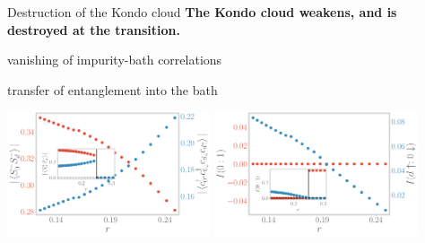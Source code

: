 \documentclass[9pt,aspectratio=169]{beamer}
\begin{document}
\begin{frame}{Destruction of the Kondo cloud}
\centering
\textbf{The Kondo cloud \alert{weakens, and is destroyed} at the transition.}

\vspace*{\fill}

\begin{minipage}{0.4\textwidth}
\begin{itemize}
	\nitem vanishing of impurity-bath correlations
\end{itemize}
\end{minipage}
\hspace*{\fill}
\begin{minipage}{0.4\textwidth}
\begin{itemize}
	\nitem transfer of entanglement into the bath
\end{itemize}
\end{minipage}

\vspace*{\fill}

\includegraphics[width=0.45\textwidth]{pairing.pdf}
\hspace*{\fill}
\includegraphics[width=0.45\textwidth]{I_r.pdf}
\end{frame}
\end{document}
